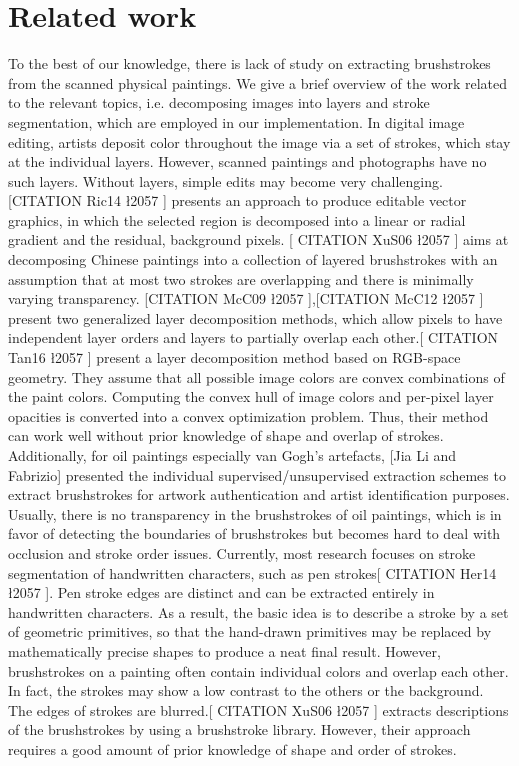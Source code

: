
\section{Related work}
To the best of our knowledge, there is lack of study on extracting brushstrokes from the scanned physical paintings. We give a brief overview of the work related to the relevant topics, i.e. decomposing images into layers and stroke segmentation, which are employed in our implementation. In digital image editing, artists deposit color throughout the image via a set of strokes, which stay at the individual layers. However, scanned paintings and photographs have no such layers. Without layers, simple edits may become very challenging.[CITATION Ric14 \l 2057 ] presents an approach to produce editable vector graphics, in which the selected region is decomposed into a linear or radial gradient and the residual, background pixels. [ CITATION XuS06 \l 2057 ] aims at decomposing Chinese paintings into a collection of layered brushstrokes with an assumption that at most two strokes are overlapping and there is minimally varying transparency. [CITATION McC09 \l 2057 ],[CITATION McC12 \l 2057 ] present two generalized layer decomposition methods, which allow pixels to have independent layer orders and layers to partially overlap each other.[ CITATION Tan16 \l 2057 ] present a layer decomposition method based on RGB-space geometry. They assume that all possible image colors are convex combinations of the paint colors. Computing the convex hull of image colors and per-pixel layer opacities is converted into a convex optimization problem. Thus, their method can work well without prior knowledge of shape and overlap of strokes. Additionally, for oil paintings especially van Gogh’s artefacts, [Jia Li and Fabrizio] presented the individual supervised/unsupervised extraction schemes to extract brushstrokes for artwork authentication and artist identification purposes. Usually, there is no transparency in the brushstrokes of oil paintings, which is in favor of detecting the boundaries of brushstrokes but becomes hard to deal with occlusion and stroke order issues.
Currently, most research focuses on stroke segmentation of handwritten characters, such as pen strokes[ CITATION Her14 \l 2057 ]. Pen stroke edges are distinct and can be extracted entirely in handwritten characters. As a result, the basic idea is to describe a stroke by a set of geometric primitives, so that the hand-drawn primitives may be replaced by mathematically precise shapes to produce a neat final result. However, brushstrokes on a painting often contain individual colors and overlap each other. In fact, the strokes may show a low contrast to the others or the background. The edges of strokes are blurred.[ CITATION XuS06 \l 2057 ] extracts descriptions of the brushstrokes by using a brushstroke library. However, their approach requires a good amount of prior knowledge of shape and order of strokes.
